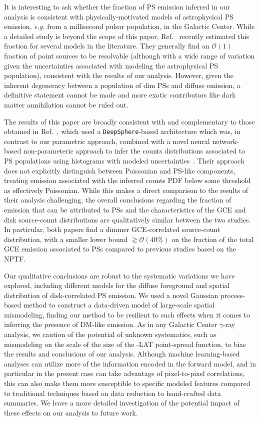 \documentclass[prd,aps,10pt,nofootinbib,twocolumn,superscriptaddress,preprintnumbers,balancelastpage,longbibliography,floatfix]{revtex4-2}
\newcommand{\changes}[1]{{{\color{red}#1}}}
\begin{document}
\changes{It is interesting to ask whether the fraction of PS emission inferred in our analysis is consistent with physically-motivated models of astrophysical PS emission, \emph{e.g.} from a millisecond pulsar population, in the Galactic Center. While a detailed study is beyond the scope of this paper, Ref.~\cite{Dinsmore:2021nip} recently estimated this fraction for several models in the literature. They generally find an $\mathcal O(1)$ fraction of point sources to be resolvable (although with a wide range of variation given the uncertainties associated with modeling the astrophysical PS population), consistent with the results of our analysis. However, given the inherent degeneracy between a population of dim PSs and diffuse emission, a definitive statement cannot be made and more exotic contributors like dark matter annihilation cannot be ruled out.}

The results of this paper are broadly consistent with and complementary to those obtained in Ref.~\cite{List:2021aer}, which used a \texttt{DeepSphere}-based architecture which was, in contrast to our parametric approach, combined with a novel neural network-based non-parameteric approach to infer the counts distributions associated to PS populations using histograms with modeled uncertainties~\cite{List2021}. Their approach does not explicitly distinguish between Poissonian and PS-like components, treating emission associated with the inferred counts PDF below some threshold as effectively Poissonian. While this makes a direct comparison to the results of their analysis challenging, the overall conclusions regarding the fraction of emission that can be attributed to PSs and the characteristics of the GCE and disk source-count distributions are qualitatively similar between the two studies. In particular, both papers find a dimmer GCE-correlated source-count distribution, with a smaller lower bound $\gtrsim \mathcal O(40\%)$ on the fraction of the total GCE emission associated to PSs compared to previous studies based on the NPTF.

Our qualitative conclusions are robust to the systematic variations we have explored, including different models for the diffuse foreground and spatial distribution of disk-correlated PS emission. We used a novel Gaussian process-based method to construct a data-driven model of large-scale spatial mismodeling, finding our method to be resilient to such effects when it comes to inferring the presence of DM-like emission. As in any Galactic Center $\gamma$-ray analysis, we caution of the potential of unknown systematics, such as mismodeling on the scale of the size of the \Fermi-LAT point-spread function, to bias the results and conclusions of our analysis. Although machine learning-based analyses can utilize more of the information encoded in the forward model, and in particular in the present case can take advantage of pixel-to-pixel correlations, this can also make them more susceptible to specific modeled features compared to traditional techniques based on data reduction to hand-crafted data summaries. We leave a more detailed investigation of the potential impact of these effects on our analysis to future work.
\end{document}
